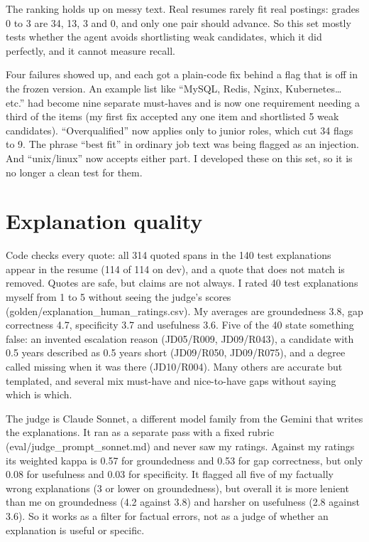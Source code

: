 \documentclass[conference]{styles/acmsiggraph}
\newcommand{\code}[1]{\textsf{\small #1}}
\begin{document}
 The ranking holds up on messy text. Real resumes rarely fit real postings: grades 0 to 3 are 34, 13, 3 and 0, and only one pair should advance. So this set mostly tests whether the agent avoids shortlisting weak candidates, which it did perfectly, and it cannot measure recall.

Four failures showed up, and each got a plain-code fix behind a flag that is off in the frozen version. An example list like ``MySQL, Redis, Nginx, Kubernetes\ldots{} etc.'' had become nine separate must-haves and is now one requirement needing a third of the items (my first fix accepted any one item and shortlisted 5 weak candidates). ``Overqualified'' now applies only to junior roles, which cut 34 flags to 9. The phrase ``best fit'' in ordinary job text was being flagged as an injection. And ``unix/linux'' now accepts either part. I developed these on this set, so it is no longer a clean test for them. 

\section{Explanation quality}

Code checks every quote: all 314 quoted spans in the 140 test explanations appear in the resume (114 of 114 on dev), and a quote that does not match is removed. Quotes are safe, but claims are not always. I rated 40 test explanations myself from 1 to 5 without seeing the judge's scores (\code{golden/explanation\_human\_ratings.csv}). My averages are groundedness 3.8, gap correctness 4.7, specificity 3.7 and usefulness 3.6. Five of the 40 state something false: an invented escalation reason (JD05/R009, JD09/R043), a candidate with 0.5 years described as 0.5 years short (JD09/R050, JD09/R075), and a degree called missing when it was there (JD10/R004). Many others are accurate but templated, and several mix must-have and nice-to-have gaps without saying which is which.

The judge is Claude Sonnet, a different model family from the Gemini that writes the explanations. It ran as a separate pass with a fixed rubric (\code{eval/judge\_prompt\_sonnet.md}) and never saw my ratings. Against my ratings its weighted kappa is 0.57 for groundedness and 0.53 for gap correctness, but only 0.08 for usefulness and 0.03 for specificity. It flagged all five of my factually wrong explanations (3 or lower on groundedness), but overall it is more lenient than me on groundedness (4.2 against 3.8) and harsher on usefulness (2.8 against 3.6). So it works as a filter for factual errors, not as a judge of whether an explanation is useful or specific.
\end{document}
